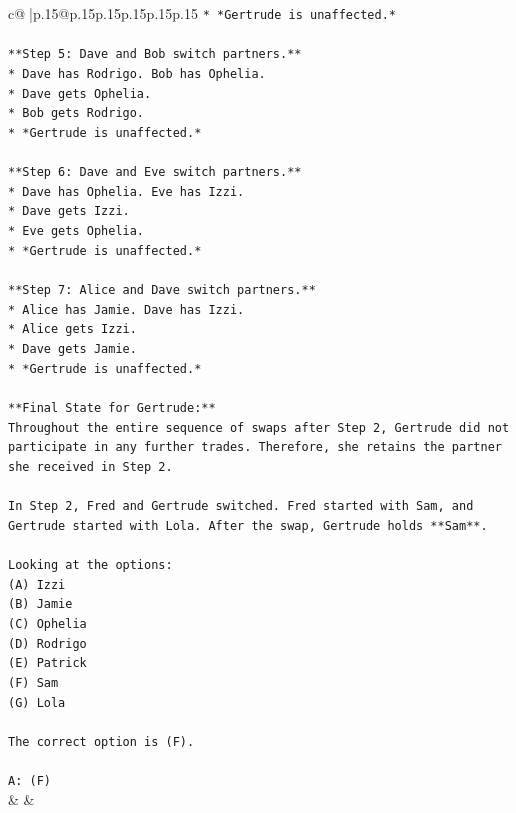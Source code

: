 \documentclass{article}
\begin{document}
{\begin{supertabular}{c@{$\;$}|p{.15\linewidth}@{}p{.15\linewidth}p{.15\linewidth}p{.15\linewidth}p{.15\linewidth}p{.15\linewidth}}
{{{\texttt{*   *Gertrude is unaffected.*} \\
\\ 
\texttt{**Step 5: Dave and Bob switch partners.**} \\
\texttt{*   Dave has Rodrigo. Bob has Ophelia.} \\
\texttt{*   Dave gets Ophelia.} \\
\texttt{*   Bob gets Rodrigo.} \\
\texttt{*   *Gertrude is unaffected.*} \\
\\ 
\texttt{**Step 6: Dave and Eve switch partners.**} \\
\texttt{*   Dave has Ophelia. Eve has Izzi.} \\
\texttt{*   Dave gets Izzi.} \\
\texttt{*   Eve gets Ophelia.} \\
\texttt{*   *Gertrude is unaffected.*} \\
\\ 
\texttt{**Step 7: Alice and Dave switch partners.**} \\
\texttt{*   Alice has Jamie. Dave has Izzi.} \\
\texttt{*   Alice gets Izzi.} \\
\texttt{*   Dave gets Jamie.} \\
\texttt{*   *Gertrude is unaffected.*} \\
\\ 
\texttt{**Final State for Gertrude:**} \\
\texttt{Throughout the entire sequence of swaps after Step 2, Gertrude did not participate in any further trades. Therefore, she retains the partner she received in Step 2.} \\
\\ 
\texttt{In Step 2, Fred and Gertrude switched. Fred started with Sam, and Gertrude started with Lola. After the swap, Gertrude holds **Sam**.} \\
\\ 
\texttt{Looking at the options:} \\
\texttt{(A) Izzi} \\
\texttt{(B) Jamie} \\
\texttt{(C) Ophelia} \\
\texttt{(D) Rodrigo} \\
\texttt{(E) Patrick} \\
\texttt{(F) Sam} \\
\texttt{(G) Lola} \\
\\ 
\texttt{The correct option is (F).} \\
\\ 
\texttt{A: (F)} \\
            }
        }
    }
    & & \\ \\


\end{supertabular}}
\end{document}
